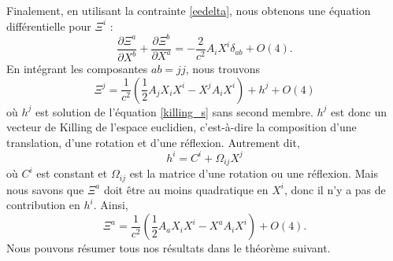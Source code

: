 			Finalement, en utilisant la contrainte \ref{eedelta}, nous obtenons une équation différentielle pour $\Xi^i$ :
			\begin{equation}
				\frac{\partial \Xi^a}{\partial X^b}+\frac{\partial \Xi^b}{\partial X^a} = -\frac{2}{c^2	} A_i X^i \delta_{ab} + O(4). \label{killing_s}
			\end{equation}
			En intégrant les composantes $ab=jj$, nous trouvons 
			\begin{equation}
				\Xi^j=\frac{1}{c^2} \left( \frac{1}{2} A_j X_iX^i - X^j A_i X^i \right) + h^j + O(4)
			\end{equation}
			où $h^j$ est solution de l'équation \ref{killing_s} sans second membre. $h^j$ est donc un vecteur de Killing de l'espace euclidien, c'est-à-dire la composition d'une translation, d'une rotation et d'une réflexion. Autrement dit, 
			\begin{equation}
				h^i=C^i+\Omega_{ij}X^j
			\end{equation}
			où $C^i$ est constant et $\Omega_{ij}$ est la matrice d'une rotation ou une réflexion. Mais nous savons que $\Xi^a$ doit être au moins quadratique en $X^i$, donc il n'y a pas de contribution en $h^i$. Ainsi, 
			\begin{equation}
				\Xi^a=\frac{1}{c^2} \left( \frac{1}{2} A_a X_iX^i - X^a A_i X^i \right) + O(4). \label{parametrisation_z_e_xi}
			\end{equation}
			Nous pouvons résumer tous nos résultats dans le théorème suivant.


